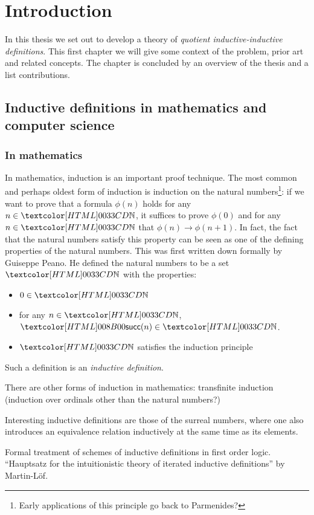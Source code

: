 \chapter{Introduction}

In this thesis we set out to develop a theory of \emph{quotient
  inductive-inductive definitions}. This first chapter we will give
some context of the problem, prior art and related concepts. The
chapter is concluded by an overview of the thesis and a list
contributions.

\section{Inductive definitions in mathematics and computer science}

\subsection{In mathematics}
In mathematics, induction is an important proof technique. The most
common and perhaps oldest form of induction is induction on the
natural numbers\footnote{Early applications of this principle go back
  to Parmenides?}: if we want to prove that a formula $\phi(n)$ holds
for any $n \in \natty$, it suffices to prove $\phi(0)$ and for any
$n \in \natty$ that $\phi(n) \to \phi(n+1)$. In fact, the fact that
the natural numbers satisfy this property can be seen as one of the
defining properties of the natural numbers. This was first written
down formally by Guiseppe Peano. He defined the natural numbers to be
a set $\natty$ with the properties:
\begin{itemize}
\item $0 \in \natty$
\item for any $n \in \natty$, $\natsucc(n) \in \natty$.
\item $\natty$ satisfies the induction principle
\end{itemize}
Such a definition is an \emph{inductive definition}.

There are other forms of induction in mathematics: transfinite
induction (induction over ordinals other than the natural numbers?) 

Interesting inductive definitions are those of the surreal numbers,
where one also introduces an equivalence relation inductively at the
same time as its elements.

Formal treatment of schemes of inductive definitions in first order
logic. ``Hauptsatz for the intuitionistic theory of iterated inductive
definitions'' by Martin-L\"of.

